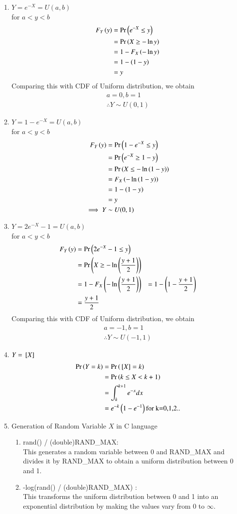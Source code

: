 \documentclass[book,11pt]{IEEEtran}
\begin{document}
\begin{enumerate}[label=(\Alph*)]
\item $Y=e^{-X}=U(a,b)$\\
for $a<y<b$ 
\begin{align}
F_Y\left(y\right)&=\Pr\left(e^{-X}\le y\right)\\
&=\Pr\left(X\ge -\ln y\right)\\
&=1-F_X\left(-\ln y\right)\\
&=1-\left(1-y\right)\\
&=y
\end{align}
Comparing this with CDF of Uniform distribution, we obtain
\begin{align}
a=0,b=1\\
\therefore Y\sim U(0,1)
\end{align}
\item $Y=1-e^{-X}=U(a,b)$\\
for $a<y<b$ 
\begin{align}
F_Y\left(y\right)&=\Pr\left(1-e^{-X}\le y\right)\\
&=\Pr\left(e^{-X}\ge 1-y\right)\\
&=\Pr\left(X \le -\ln\left(1-y\right)\right)\\
&=F_X\left(-\ln\left(1-y\right)\right)\\
&=1-\left(1-y\right)\\
&=y\\
\implies Y&\sim U(0,1)
\end{align}
\item $Y=2e^{-X}-1=U(a,b)$\\
for $a<y<b$ 
\begin{align}
F_Y\left(y\right)&=\Pr\left(2e^{-X}-1\le y\right)\\
&=\Pr\left(X\ge -\ln\left(\frac{y+1}{2}\right)\right)\\
&=1-F_X\left(-\ln\left(\frac{y+1}{2}\right)\right)
&=1-\left(1-\frac{y+1}{2}\right)\\
&=\frac{y+1}{2}
\end{align}
Comparing this with CDF of Uniform distribution, we obtain
\begin{align}
a=-1,b=1\\
\therefore Y\sim U(-1,1)
\end{align}
\item $Y={}\left[X\right]$
\begin{align}
\Pr\left(Y=k\right)&=\Pr\left({}\left[X\right]=k\right)\\
&=\Pr\left(k\le X<k+1\right)\\
&=\int_{k}^{k+1}e^{-x}dx\\
&=e^{-k}\left(1-e^{-1}\right) \text{for k=0,1,2..}
\end{align}
\item Generation of Random Variable $X$ in C language
\begin{enumerate}[label=(\roman*)]
\item rand() / (double)RAND\_MAX:\\ This generates a random variable between 0 and RAND\_MAX and divides it by RAND\_MAX to obtain a uniform distribution between 0 and 1.
\item -log(rand() / (double)RAND\_MAX) :\\ This transforms the uniform distribution between 0 and 1 into an exponential distribution by making the values vary from 0 to $\infty$.
\end{enumerate}
\end{enumerate} 
\end{document}
